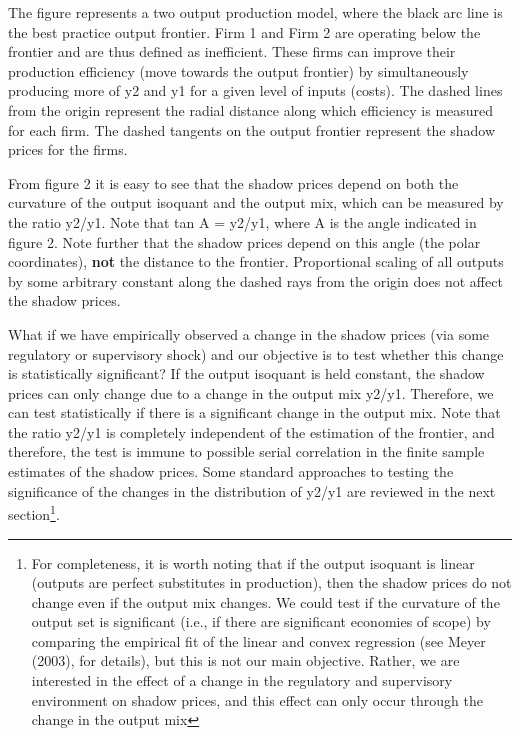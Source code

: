 \documentclass[
  10pt,
]{article}
\begin{document}
\begin{footnotesize} 
The figure represents a two output production model, where the black arc line is the best practice output frontier. Firm 1 and Firm 2 are operating below the frontier and are thus defined as inefficient. These firms can improve their production efficiency (move towards the output frontier) by simultaneously producing more of y2 and y1 for a given level of inputs (costs). The dashed lines from the origin represent the radial distance along which efficiency is measured for each firm.  The dashed tangents on the output frontier represent the shadow prices for the firms.
\end{footnotesize}

From figure 2 it is easy to see that the shadow prices depend on both
the curvature of the output isoquant and the output mix, which can be
measured by the ratio y2/y1. Note that tan A = y2/y1, where A is the
angle indicated in figure 2. Note further that the shadow prices depend
on this angle (the polar coordinates), \textbf{not} the distance to the
frontier. Proportional scaling of all outputs by some arbitrary constant
along the dashed rays from the origin does not affect the shadow prices.

What if we have empirically observed a change in the shadow prices (via
some regulatory or supervisory shock) and our objective is to test
whether this change is statistically significant? If the output isoquant
is held constant, the shadow prices can only change due to a change in
the output mix y2/y1. Therefore, we can test statistically if there is a
significant change in the output mix. Note that the ratio y2/y1 is
completely independent of the estimation of the frontier, and therefore,
the test is immune to possible serial correlation in the finite sample
estimates of the shadow prices. Some standard approaches to testing the
significance of the changes in the distribution of y2/y1 are reviewed in
the next section\footnote{For completeness, it is worth noting that if
  the output isoquant is linear (outputs are perfect substitutes in
  production), then the shadow prices do not change even if the output
  mix changes. We could test if the curvature of the output set is
  significant (i.e., if there are significant economies of scope) by
  comparing the empirical fit of the linear and convex regression (see
  Meyer (2003), for details), but this is not our main objective.
  Rather, we are interested in the effect of a change in the regulatory
  and supervisory environment on shadow prices, and this effect can only
  occur through the change in the output mix}.
\end{document}
